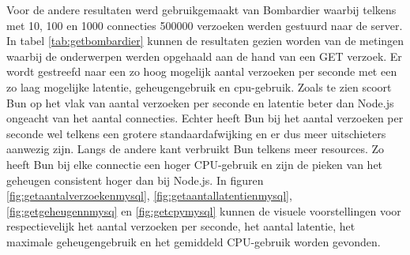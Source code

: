 Voor de andere resultaten werd gebruikgemaakt van Bombardier waarbij telkens met 10, 100 en 1000 connecties 
500000 verzoeken werden gestuurd naar de server.
In tabel \ref{tab:getbombardier} kunnen de resultaten gezien worden van de metingen waarbij de onderwerpen werden opgehaald aan de hand van een GET verzoek.
Er wordt gestreefd naar een zo hoog mogelijk aantal verzoeken per seconde met een zo laag mogelijke latentie, geheugengebruik en cpu-gebruik.
Zoals te zien scoort Bun op het vlak van aantal verzoeken per seconde en latentie beter dan Node.js ongeacht van het aantal connecties. 
Echter heeft Bun bij het aantal verzoeken per seconde wel telkens een grotere standaardafwijking en er dus meer uitschieters aanwezig zijn.
Langs de andere kant verbruikt Bun telkens meer resources. Zo heeft Bun bij elke connectie een hoger CPU-gebruik en zijn de pieken van het geheugen consistent hoger dan bij Node.js.
In figuren \ref{fig:getaantalverzoekenmysql}, \ref{fig:getaantallatentienmysql}, \ref{fig:getgeheugennmysq} en \ref{fig:getcpymysql} kunnen de visuele voorstellingen 
voor respectievelijk het aantal verzoeken per seconde, het aantal latentie, het maximale geheugengebruik en het gemiddeld CPU-gebruik worden gevonden.
